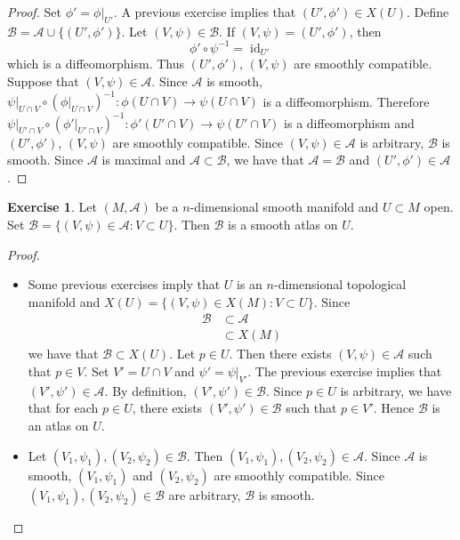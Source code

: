 \documentclass{book}
\theoremstyle{definition}
\newtheorem{ex}[definition]{Exercise}
\newcommand{\MA}{\mathcal{A}}
\newcommand{\MB}{\mathcal{B}}
\DeclareMathOperator{\id}{id}
\DeclareMathOperator*{\0}{\mbf{0}}
\DeclareMathOperator*{\1}{\mbf{1}}
\begin{document}
	\begin{proof}
	Set $\phi' = \phi|_{U'}$. A previous exercise implies that $(U', \phi') \in X(U)$. Define $\MB = \MA \cup \{(U', \phi')\}$. Let $(V, \psi) \in \MB$. If $(V, \psi) = (U', \phi')$, then 
	$$\phi' \circ \psi^{-1} = \id_{U'}$$
	which is a diffeomorphism. Thus $(U', \phi')$, $(V, \psi)$ are smoothly compatible. Suppose that $(V, \psi) \in \MA$. Since $\MA$ is smooth, $\psi|_{U \cap V} \circ (\phi|_{U \cap V})^{-1}: \phi(U \cap V) \rightarrow \psi(U \cap V)$ is a diffeomorphism. Therefore $\psi|_{U' \cap V} \circ (\phi'|_{U' \cap V})^{-1}: \phi'(U' \cap V) \rightarrow \psi(U' \cap V)$ is a diffeomorphism and $(U', \phi')$, $(V, \psi)$ are smoothly compatible. Since $(V, \psi) \in \MA$ is arbitrary, $\MB$ is smooth. Since $\MA$ is maximal and $\MA \subset \MB$, we have that $\MA = \MB$ and $(U', \phi') \in \MA$.
	\end{proof}

	\begin{ex}
		Let $(M, \MA)$ be a $n$-dimensional smooth manifold and $U \subset M$ open. Set $\MB = \{(V, \psi) \in \MA: V \subset U\}$. Then $\MB$ is a smooth atlas on $U$.
	\end{ex}

	\begin{proof}\
		\begin{itemize}
			\item Some previous exercises imply that $U$ is an $n$-dimensional topological manifold and $X(U) = \{(V, \psi) \in X(M): V \subset U\}$. Since 
			\begin{align*}
				\MB 
				& \subset \MA \\
				& \subset X(M)
			\end{align*}
			we have that $\MB \subset X(U)$. Let $p \in U$. Then there exists $(V, \psi) \in \MA$ such that $p \in V$. Set $V' = U \cap V$ and $\psi' = \psi|_{V'}$. The previous exercise implies that $(V', \psi') \in \MA$. By definition, $(V', \psi') \in \MB$. Since $p \in U$ is arbitrary, we have that for each $p \in U$, there exists $(V', \psi') \in \MB$ such that $p \in V'$. Hence $\MB$ is an atlas on $U$. 
			\item Let $(V_1, \psi_1), (V_2, \psi_2) \in \MB$. Then $(V_1, \psi_1), (V_2, \psi_2) \in \MA$. Since $\MA$ is smooth, $(V_1, \psi_1)$ and $(V_2, \psi_2)$ are smoothly compatible. Since $(V_1, \psi_1), (V_2, \psi_2) \in \MB$ are arbitrary, $\MB$ is smooth.
		\end{itemize}
 	\end{proof}
 
\end{document}
